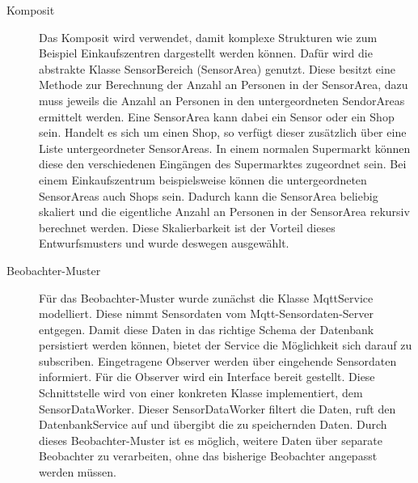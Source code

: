 \documentclass[runningheads]{llncs}
\begin{document}
\begin{description}
\item[Komposit]
Das Komposit wird verwendet, damit komplexe Strukturen wie zum Beispiel Einkaufszentren dargestellt werden können.
Dafür wird die abstrakte Klasse SensorBereich (SensorArea) genutzt. Diese besitzt eine Methode zur Berechnung der Anzahl an Personen in der SensorArea, dazu muss jeweils die Anzahl an Personen in den untergeordneten SendorAreas ermittelt werden.
Eine SensorArea kann dabei ein Sensor oder ein Shop sein.
Handelt es sich um einen Shop, so verfügt dieser zusätzlich über eine Liste untergeordneter SensorAreas.
In einem normalen Supermarkt können diese den verschiedenen Eingängen des Supermarktes zugeordnet sein.
Bei einem Einkaufszentrum beispielsweise können die untergeordneten SensorAreas auch Shops sein.
Dadurch kann die SensorArea beliebig skaliert und die eigentliche Anzahl an Personen in der SensorArea rekursiv berechnet werden.  
Diese Skalierbarkeit ist der Vorteil dieses Entwurfsmusters und wurde deswegen ausgewählt. 
\item[Beobachter-Muster]
Für das Beobachter-Muster wurde zunächst die Klasse MqttService modelliert. 
Diese nimmt Sensordaten vom Mqtt-Sensordaten-Server entgegen.
Damit diese Daten in das richtige Schema der Datenbank persistiert werden können, bietet der Service die Möglichkeit sich darauf zu subscriben.
Eingetragene Observer werden über eingehende Sensordaten informiert.
Für die Observer wird ein Interface bereit gestellt.
Diese Schnittstelle wird von einer konkreten Klasse implementiert, dem SensorDataWorker.
Dieser SensorDataWorker filtert die Daten, ruft den DatenbankService auf und übergibt die zu speichernden Daten.
Durch dieses Beobachter-Muster ist es möglich, weitere Daten über separate Beobachter zu verarbeiten, ohne das bisherige Beobachter angepasst werden müssen.
\end{description}
\end{document}
